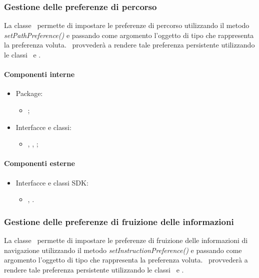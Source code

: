 \documentclass[../Funzionalita.tex]{subfiles}
\begin{document}
		
		\subsubsection{Gestione delle preferenze di percorso}
			La classe \SettingImp\ permette di impostare le preferenze di percorso utilizzando il metodo \textit{setPathPreference()} e passando come argomento l'oggetto di tipo \PathPreference che rappresenta la preferenza voluta. \SettingImp\ provvederà a rendere tale preferenza persistente utilizzando le classi \SharedPreference\ e \SharedPreferenceEditor.

			\paragraph*{Componenti interne}
			\begin{itemize}
			
				\item Package:
				\begin{itemize}
					\item[] \usersetting;
				\end{itemize}
				
				\item Interfacce e classi:
				\begin{itemize}
					\item[] \Setting, \SettingImp, \PathPreference;
				\end{itemize}
				
			\end{itemize}
			
			
			\paragraph*{Componenti esterne}
			
			\begin{itemize}
				\item Interfacce e classi SDK:
				\begin{itemize}
					\item[] \SharedPreference, \SharedPreferenceEditor.
				\end{itemize}
			\end{itemize}
		
		
		\subsubsection{Gestione delle preferenze di fruizione delle informazioni}
			La classe \SettingImp\ permette di impostare le preferenze di fruizione delle informazioni di navigazione utilizzando il metodo \textit{setInstructionPreference()} e passando come argomento l'oggetto di tipo \InstructionPreference che rappresenta la preferenza voluta. \SettingImp\ provvederà a rendere tale preferenza persistente utilizzando le classi \SharedPreference\ e \SharedPreferenceEditor.
		
\end{document}

